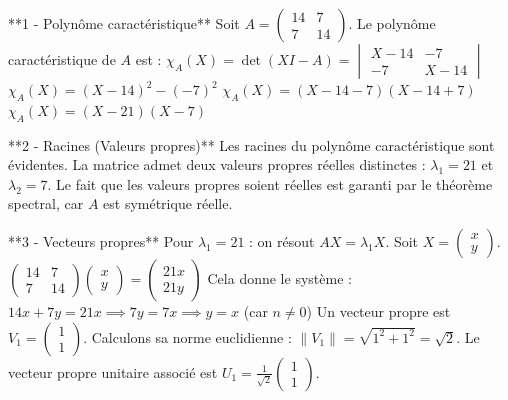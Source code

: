 \documentclass[11pt,a4paper]{article}
\begin{document}
**1 - Polynôme caractéristique**
Soit $A = \begin{pmatrix} 14 & 7 \\ 7 & 14 \end{pmatrix}$.
Le polynôme caractéristique de $A$ est :
$\chi_A(X) = \det(X I - A) = \begin{vmatrix} X - 14 & -7 \\ -7 & X - 14 \end{vmatrix}$
$\chi_A(X) = (X - 14)^2 - (-7)^2$
$\chi_A(X) = (X - 14 - 7)(X - 14 + 7)$
$\chi_A(X) = (X - 21)(X - 7)$

**2 - Racines (Valeurs propres)**
Les racines du polynôme caractéristique sont évidentes. La matrice admet deux valeurs propres réelles distinctes :
$\lambda_1 = 21$ et $\lambda_2 = 7$.
Le fait que les valeurs propres soient réelles est garanti par le théorème spectral, car $A$ est symétrique réelle.

**3 - Vecteurs propres**
Pour $\lambda_1 = 21$ : on résout $AX = \lambda_1 X$.
Soit $X = \begin{pmatrix} x \\ y \end{pmatrix}$.
$\begin{pmatrix} 14 & 7 \\ 7 & 14 \end{pmatrix} \begin{pmatrix} x \\ y \end{pmatrix} = \begin{pmatrix} 21x \\ 21y \end{pmatrix}$
Cela donne le système :
$14x + 7y = 21x \implies 7y = 7x \implies y = x$ (car $n \neq 0$)
Un vecteur propre est $V_1 = \begin{pmatrix} 1 \\ 1 \end{pmatrix}$.
Calculons sa norme euclidienne : $\|V_1\| = \sqrt{1^2 + 1^2} = \sqrt{2}$.
Le vecteur propre unitaire associé est $U_1 = \frac{1}{\sqrt{2}} \begin{pmatrix} 1 \\ 1 \end{pmatrix}$.
\end{document}
